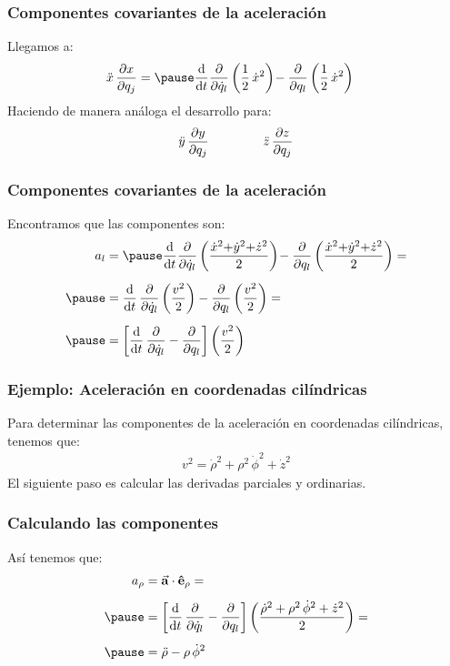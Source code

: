 \documentclass[12pt]{beamer}
\begin{document}
\begin{frame}
\frametitle{Componentes covariantes de la aceleración}
Llegamos a:
\pause
\begin{eqnarray*}
\begin{aligned}
\ddot{x} \, \pdv{x}{q_{j}} &= \pause \dv{t} \pdv{\dot{q}_{l}} \left( \dfrac{1}{2} \, \dot{x}^{2} \right) \!- \pdv{q_{l}} \left( \dfrac{1}{2} \, \dot{x}^{2} \right)
\end{aligned}
\end{eqnarray*}
\pause
Haciendo de manera análoga el desarrollo para:
\begin{align*}
\ddot{y} \, \pdv{y}{q_{j}} \hspace{1.5cm} \ddot{z} \, \pdv{z}{q_{j}}
\end{align*}
\end{frame}
\begin{frame}
\frametitle{Componentes covariantes de la aceleración}
Encontramos que las componentes son:
\pause
\begin{eqnarray}
\begin{aligned}[b]
a_{l} &= \pause \dv{t} \pdv{\dot{q}_{l}} \left( \dfrac{\dot{x}^{2} {+} \dot{y}^{2} {+} \dot{z}^{2}}{2} \right) \!- \pdv{q_{l}} \left( \dfrac{\dot{x}^{2} {+} \dot{y}^{2} {+} \dot{z}^{2}}{2} \right) = \\[0.5em] \pause
&= \dv{t} \, \pdv{\dot{q}_{l}} \left( \dfrac{v^{2}}{2} \right) - \pdv{q_{l}} \left( \dfrac{v^{2}}{2} \right) = \\[0.5em] \pause
&= \bigg[ \dv{t} \, \pdv{\dot{q}_{l}} - \pdv{q_{l}} \bigg] \left( \dfrac{v^{2}}{2} \right)
\end{aligned}
\label{eq:ecuacion_01_14}
\end{eqnarray}
\end{frame}
\begin{frame}
\frametitle{\textbf{Ejemplo: } Aceleración en coordenadas cilíndricas}
Para determinar las componentes de la aceleración en coordenadas cilíndricas, tenemos que:
\pause
\begin{align*}
v^{2} = \dot{\rho}^{2} + \rho^{2} \, \dot{\phi}^{2} + \dot{z}^{2}
\end{align*}
\pause
El siguiente paso es calcular las derivadas parciales y ordinarias.
\end{frame}
\begin{frame}
\frametitle{Calculando las componentes}
Así tenemos que:
\begin{eqnarray*}
\begin{aligned}
a_{\rho} &= \va{a} \cdot \vu{e}_{\rho} = \\[0.5em] \pause
&= \bigg[ \dv{t} \, \pdv{\dot{q}_{l}} - \pdv{q_{l}} \bigg] \left( \dfrac{\dot{\rho}^{2} + \rho^{2} \, \dot{\phi}^{2} + \dot{z}^{2}}{2} \right) = \\[0.5em] \pause
&= \ddot{\rho} - \rho \, \dot{\phi}^{2}
\end{aligned}
\end{eqnarray*}
\end{frame}
\end{document}
